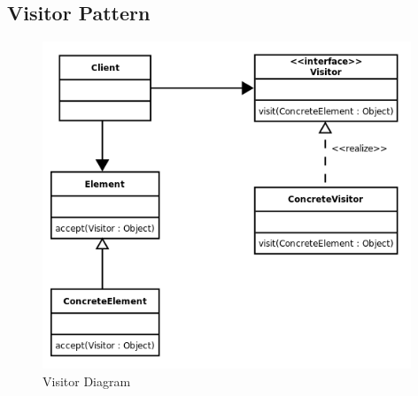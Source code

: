 \subsection{Visitor Pattern}
\begin{figure}[h!]
	\centering
	\includegraphics[width=110mm]{Figures/visitor_diagram.png}
	\caption{Visitor Diagram\label{overflow}}
\end{figure}
